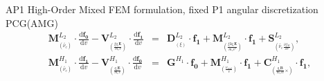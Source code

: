 \documentclass[8pt, compress]{beamer}
\newcommand{\pdv}[2]{\frac{\partial{#1}}{\partial{#2}}}
\newcommand{\vect}[1]{\boldsymbol{#1}}
\newcommand{\matr}[1]{\mathbf{#1}}
\newcommand{\dI}{\text{d}}
\newcommand{\odv}[2]{\frac{\dI #1}{\dI #2}}
\newcommand{\ddv}[2]{\odv{#1}{#2}}
\newcommand{\nue}{\nu_{e}}
\newcommand{\nuscat}{\nu_{scat}}
\newcommand{\vmag}{v}
\newcommand{\E}{\vect{E}}
\newcommand{\B}{\vect{B}}
\newcommand{\qe}{q_e}
\newcommand{\me}{m_e}
\newcommand{\fM}{f_M}
\newcommand{\vfzero}{\vect{f_0}}
\newcommand{\fone}{{\vect{f_1}}}
\newcommand{\colorimportant}[1]{ {\color{purple} #1} }
\begin{document}
\newcommand{\edf}{\colorimportant{f}}
\renewcommand{\fs}{0.4}
\begin{frame}
\begin{center}
{\Large AP1 High-Order Mixed FEM formulation, fixed P1 angular discretization PCG(AMG)}
\begin{eqnarray}
  \matr{M}^{L_2}_{_{(\tilde{\nue})}}\cdot\ddv{\vfzero}{\vmag} 
  - \matr{V}^{L_2}_{_{(\frac{\xi\qe\E}{\me\vmag})}}\cdot\ddv{\fone}{\vmag}
  &=&
  \matr{D}^{L_2}_{_{(\xi)}}\cdot\fone 
  + \matr{M}^{L_2}_{_{(\frac{\xi2\qe\E}{\me\vmag^2})}}\cdot\fone
  + \vect{S}^{L_2}_{_{(\tilde{\nue}\pdv{\fM}{\vmag})}}, 
  \nonumber\label{eq:FEMAP1f0}
  \\
  \matr{M}^{H_1}_{_{(\tilde{\nue})}}\cdot\ddv{\fone}{\vmag}
  - \matr{V}^{H_1}_{_{(\frac{\qe\E}{\me\vmag})}}\cdot\ddv{\vfzero}{\vmag}
   &=& 
  \matr{G}^{H_1}\cdot\vfzero 
  + \matr{M}^{H_1}_{_{(\frac{\nuscat}{\vmag})}}\cdot\fone 
  + \matr{C}^{H_1}_{_{(\frac{\qe\B}{\me c \vmag}\vect{\times})}}\cdot\fone
  ,
  \nonumber \label{eq:FEMAP1f1}
\end{eqnarray}


\end{center}
\end{frame}
\end{document}
